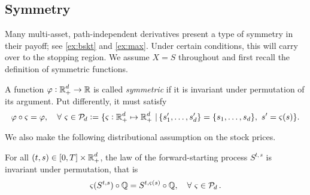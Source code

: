 \subsection{Symmetry}\label{sec:symmetry}

Many multi-asset, path-independent derivatives  present a type of symmetry in their payoff; see  \cref{ex:bskt} and \ref{ex:max}. Under certain conditions, this will carry over to the  stopping region. 
We assume $X=S$ throughout and  first recall the definition of symmetric functions. 

\begin{definition}
  A  function $\varphi: \operatorname{\mathbb{R}}_+^d \to \operatorname{\mathbb{R}}$ is called  \textit{symmetric} if it is invariant under permutation of its argument. Put differently, it must satisfy
    $$\varphi \circ \varsigma = \varphi, \quad \forall \ \varsigma \in \operatorname{\mathcal{P}}_{\! d} :=  \{\varsigma: \operatorname{\mathbb{R}}^d_+ \mapsto \operatorname{\mathbb{R}}^d_+ \, |\, \{s'_1,\ldots,s'_d\}=\{s_1,\ldots,s_d\}, \ s' = \varsigma(s) \}.$$%
\end{definition}

We also make the following distributional assumption on the stock prices.

\begin{asm}\label{asm: id} For all $(t,s)\in [0,T]\times \operatorname{\mathbb{R}}_+^d$, the law of the forward-starting process $S^{t,s}$  is invariant under permutation, that is
    \begin{equation}\label{eq:id}
        \varsigma(S^{t,s}) \circ \operatorname{\mathbb{Q}} = S^{t,\varsigma(s)} \circ  \operatorname{\mathbb{Q}}, \quad \forall \ \varsigma \in \operatorname{\mathcal{P}}_{\!d}.
    \end{equation}

\end{asm}

